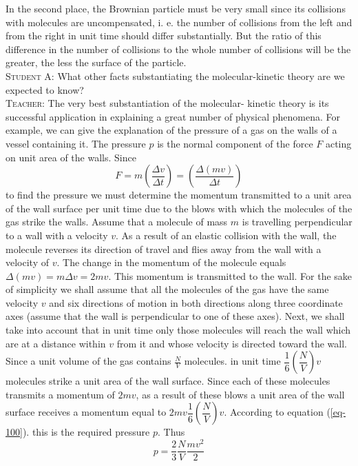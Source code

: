 \documentclass[a4paper,sfsidenotes]{tufte-book}
\begin{document}
In the second place, the Brownian particle must be very small since its collisions with molecules are uncompensated, i. e. the number of collisions from the left and from the right in unit time should differ substantially. But the ratio of this difference in the number of collisions to the whole number of collisions will be the greater, the less the surface of the particle.
\\
\textsc{Student A:} What other facts substantiating the molecular-kinetic theory are we expected to know?
\\
\textsc{Teacher:} The very best substantiation of the molecular- kinetic theory is its successful application in explaining a great number of physical phenomena. For example, we can give the explanation of the pressure of a gas on the walls of a vessel containing it. The pressure $p$ is the normal component of the force $F$ acting on unit area of the walls. Since
\begin{equation}
F=m \left( \frac{\Delta v}{\Delta t} \right) = \left( \frac{\Delta (mv)}{\Delta t} \right)
\label{eq-100}
\end{equation}
to find the pressure we must determine the momentum transmitted to a unit area of the wall surface per unit time due to the blows with which the molecules of the gas strike the walls. Assume that a molecule of mass $m$ is travelling perpendicular to a wall with a velocity $v$. As a result of an elastic collision with the wall, the molecule reverses its direction of travel and flies away from the wall with a velocity of $v$. The change in the momentum of the molecule equals $\Delta (mv)=m \Delta v=2mv$. This momentum is transmitted to the wall. For the sake of simplicity we shall assume that all the molecules of the gas have the same velocity $v$ and six directions of motion in both directions along three coordinate axes (assume that the wall is perpendicular to one of these axes). Next, we shall take into account that in unit time only those molecules will reach the wall which are at a distance within $v$ from it and whose velocity is directed toward the wall. Since a unit volume of the gas contains $\frac{N}{V}$ molecules. in unit time $\dfrac{1}{6}\left(\dfrac{N}{V} \right)v$ molecules strike a unit area of the wall surface. Since each of these molecules transmits a momentum of $2mv$, as a result of these blows a unit area of the wall surface receives a momentum equal to $2mv \dfrac{1}{6}\left(\dfrac{N}{V} \right)v$. According to equation (\ref{eq-100}). this is the required pressure $p$. Thus
\begin{equation}%
p= \frac{2}{3}\frac{N}{V} \frac{mv^{2}}{2}
\label{eq-101}
\end{equation}
\end{document}
